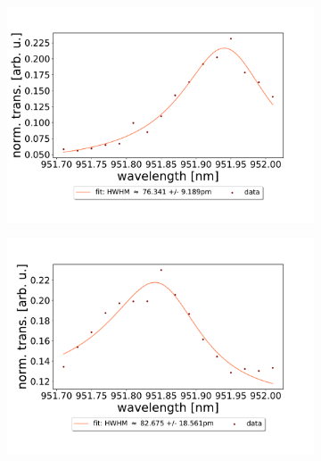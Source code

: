 \begin{figure}[h!]
\begin{subfigure}[b]{0.49\textwidth}
        \includegraphics[width=\textwidth]{figures/results/double fano fits/120um_M3:M5_fit_3.pdf}
        \caption{}
        \label{fig:120um_M3:M5_fit_3}
    \end{subfigure}
    \begin{subfigure}[b]{0.49\textwidth}
        \includegraphics[width=\textwidth]{figures/results/double fano fits/120um_M3:M5_fit_4.pdf}
        \caption{}
        \label{fig:120um_M3:M5_fit_4}
    \end{subfigure}
    \begin{subfigure}[b]{0.49\textwidth}

\end{subfigure}
\end{figure}
